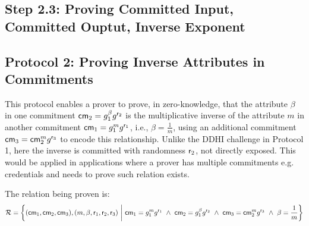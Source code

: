 \newpage
\subsection{Step 2.3: Proving Committed Input, Committed Ouptut, Inverse Exponent}

\subsection*{Protocol 2: Proving Inverse Attributes in Commitments}
This protocol enables a prover to prove, in zero-knowledge, that the attribute $\beta$ in one commitment $\mathsf{cm}_2 = g_1^\beta g^{\mathsf{r}_2}$ is the multiplicative inverse of the attribute $m$ in another commitment $\mathsf{cm}_1 = g_1^m g^{\mathsf{r}_1}$, i.e., $\beta = \frac{1}{m}$, using an additional commitment $\mathsf{cm}_3 = \mathsf{cm}_2^m g^{\mathsf{r}_3}$ to encode this relationship. Unlike the DDHI challenge in Protocol 1, here the inverse is committed with randomness $\mathsf{r}_2$, not directly exposed. This would be applied in applications where a prover has multiple commitments e.g. credentials and needs to prove such relation exists.

The relation being proven is:
\[
\mathcal{R} = \left\{ (\cm_1, \cm_2, \cm_3), (m, \beta, \usk_1, \usk_2, \usk_3) \ \middle|\ \cm_1 = g_1^m g^{\usk_1} \ \land\ \cm_2 = g_1^\beta g^{\usk_2} \ \land\ \cm_3 = \cm_2^m g^{\usk_3} \ \land\ \beta = \frac{1}{m} \right\}
\]

